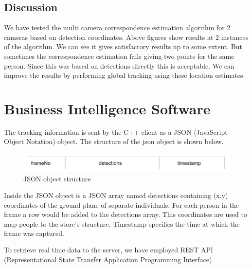 \documentclass[12pt,a4paper]{report}
\begin{document}
\subsection{Discussion}
We have tested the multi camera correspondence estimation algorithm for 2 cameras based on detection coordinates. Above figures show results at 2 instances of the algorithm. We can see it gives satisfactory results up to some extent. But sometimes the correspondence estimation fails giving two points for the same person. Since this was based on detections directly this is acceptable. We can improve the results by performing global tracking using these location estimates.

\section{Business Intelligence Software}
The tracking information is sent by the C++ client as a JSON (JavaScript Object Notation) object. The structure of the json object is shown below.
\begin{figure}[H]
\includegraphics[width=12cm]{pak1.png}
\centering
\caption{JSON object structure}
\label{pak1}
\end{figure}

Inside the JSON object is a JSON array named detections containing (x,y) coordinates of the ground plane of separate individuals. For each person in the frame a row would be added to the detections array. This coordinates are used to map people to the store’s structure. Timestamp specifies the time at which the frame was captured.

\par To retrieve real time data to the server, we have employed REST API (Representational State Transfer Application Programming Interface).  
\end{document}
